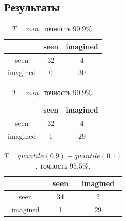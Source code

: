\documentclass{beamer}
\begin{document}
		\subsection{Результаты}
			\begin{frame} 
				\vspace{0.5cm}	
				
				\begin{table}
					\begin{minipage}{.5\linewidth}				
						\begin{tabular}{c|cc}
							& \multicolumn{1}{c|}{seen} & imagined \\ \hline
							seen     & 32                        & 4        \\ \cline{1-1}
							imagined & 0                         & 30      
						\end{tabular}
						\caption{$T = mean$, точность $93.9\%$.}
					\end{minipage}%
					\begin{minipage}{.5\linewidth}				
						\begin{tabular}{c|cc}
							& \multicolumn{1}{c|}{seen} & imagined \\ \hline
							seen     & 32                        & 4        \\ \cline{1-1}
							imagined & 1                         & 29      
						\end{tabular}
						\caption{$T = min$, точность $90.9\%$.}
					\end{minipage} 
				\end{table}
				
				\begin{table}[]
					\begin{tabular}{c|cc}
						& \multicolumn{1}{c|}{seen} & imagined \\ \hline
						seen     & 34                        & 2        \\ \cline{1-1}
						imagined & 1                         & 29      
					\end{tabular}
					\caption{$T = quantile(0.9) - quantile(0.1)$, точность $95.5\%$.}
				\end{table}
			\end{frame}
\end{document}
